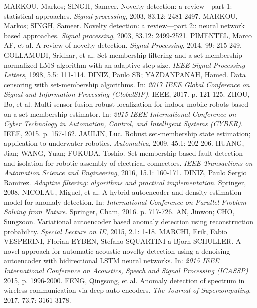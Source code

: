 \documentclass[11pt,twoside,openright]{report}
\begin{document}
\begin{thebibliography}{L}
MARKOU, Markos; SINGH, Sameer. Novelty detection: a review—part 1: statistical approaches. \textit{Signal processing}, 2003, 83.12: 2481-2497.
MARKOU, Markos; SINGH, Sameer. Novelty detection: a review—part 2:: neural network based approaches. \textit{Signal processing}, 2003, 83.12: 2499-2521.
PIMENTEL, Marco AF, et al. A review of novelty detection. \textit{Signal Processing}, 2014, 99: 215-249.
GOLLAMUDI, Sridhar, et al. Set-membership filtering and a set-membership normalized LMS algorithm with an adaptive step size. \textit{IEEE Signal Processing Letters}, 1998, 5.5: 111-114.
DINIZ, Paulo SR; YAZDANPANAH, Hamed. Data censoring with set-membership algorithms. In: \textit{2017 IEEE Global Conference on Signal and Information Processing (GlobalSIP)}. IEEE, 2017. p. 121-125.
ZHOU, Bo, et al. Multi-sensor fusion robust localization for indoor mobile robots based on a set-membership estimator. In: \textit{2015 IEEE International Conference on Cyber Technology in Automation, Control, and Intelligent Systems (CYBER)}. IEEE, 2015. p. 157-162.
JAULIN, Luc. Robust set-membership state estimation; application to underwater robotics. \textit{Automatica}, 2009, 45.1: 202-206.
HUANG, Jian; WANG, Yuan; FUKUDA, Toshio. Set-membership-based fault detection and isolation for robotic assembly of electrical connectors. \textit{IEEE Transactions on Automation Science and Engineering}, 2016, 15.1: 160-171.
DINIZ, Paulo Sergio Ramirez. \textit{Adaptive filtering: algorithms and practical implementation}. Springer, 2008.
NICOLAU, Miguel, et al. A hybrid autoencoder and density estimation model for anomaly detection. In: \textit{International Conference on Parallel Problem Solving from Nature}. Springer, Cham, 2016. p. 717-726.
AN, Jinwon; CHO, Sungzoon. Variational autoencoder based anomaly detection using reconstruction probability. \textit{Special Lecture on IE}, 2015, 2.1: 1-18.
MARCHI, Erik, Fabio VESPERINI, Florian EYBEN, Stefano SQUARTINI a Bjorn SCHULLER. A novel approach for automatic acoustic novelty detection using a denoising autoencoder with bidirectional LSTM neural networks. In: \textit{2015 IEEE International Conference on Acoustics, Speech and Signal Processing (ICASSP)} 2015, p. 1996-2000.
FENG, Qingsong, et al. Anomaly detection of spectrum in wireless communication via deep auto-encoders. \textit{The Journal of Supercomputing}, 2017, 73.7: 3161-3178.

\end{thebibliography}
\end{document}
